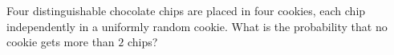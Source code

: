 Four distinguishable chocolate chips are placed in four cookies, each chip independently in a uniformly random cookie. What is the probability that no cookie gets more than $2$ chips?
